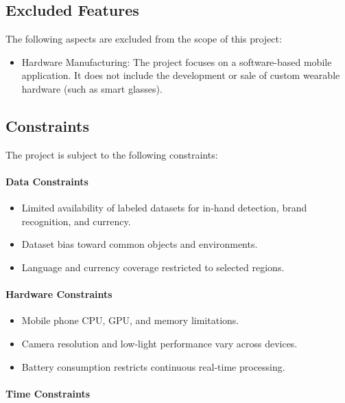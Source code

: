 \documentclass[12pt,a4paper]{report}
\begin{document}
\subsection{Excluded Features}

The following aspects are excluded from the scope of this project:

\begin{itemize}
  \item Hardware Manufacturing: The project focuses on a software-based mobile application. It does not include the development or sale of custom wearable hardware (such as smart glasses).
\end{itemize}

\subsection{Constraints}

The project is subject to the following constraints:

\paragraph*{Data Constraints}

\begin{itemize}
  \item Limited availability of labeled datasets for in-hand detection, brand recognition, and currency.
  \item Dataset bias toward common objects and environments.
  \item Language and currency coverage restricted to selected regions.
\end{itemize}

\paragraph*{Hardware Constraints}

\begin{itemize}
  \item Mobile phone CPU, GPU, and memory limitations.
  \item Camera resolution and low-light performance vary across devices.
  \item Battery consumption restricts continuous real-time processing.
\end{itemize}

\paragraph*{Time Constraints}
\end{document}
